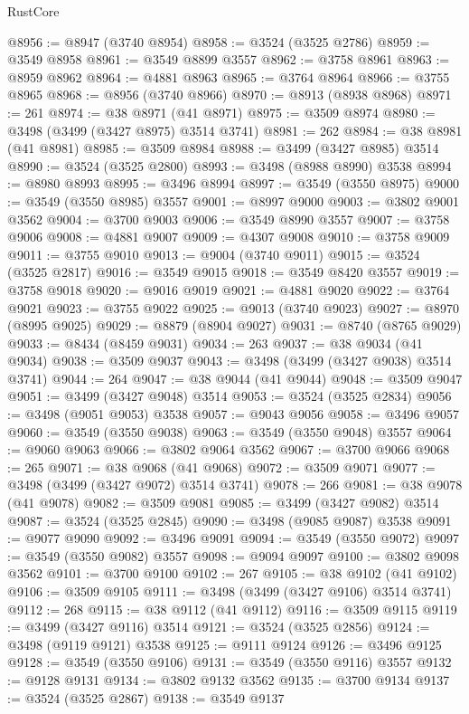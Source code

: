 \begin{lexlean}{RustCore}
\begin{coremodule}
@8956 := @8947 (@3740 @8954)
@8958 := @3524 (@3525 @2786)
@8959 := @3549 @8958
@8961 := @3549 @8899 @3557
@8962 := @3758 @8961
@8963 := @8959 @8962
@8964 := @4881 @8963
@8965 := @3764 @8964
@8966 := @3755 @8965
@8968 := @8956 (@3740 @8966)
@8970 := @8913 (@8938 @8968)
@8971 := 261
@8974 := @38 @8971 (@41 @8971)
@8975 := @3509 @8974
@8980 := @3498 (@3499 (@3427 @8975) @3514 @3741)
@8981 := 262
@8984 := @38 @8981 (@41 @8981)
@8985 := @3509 @8984
@8988 := @3499 (@3427 @8985) @3514
@8990 := @3524 (@3525 @2800)
@8993 := @3498 (@8988 @8990) @3538
@8994 := @8980 @8993
@8995 := @3496 @8994
@8997 := @3549 (@3550 @8975)
@9000 := @3549 (@3550 @8985) @3557
@9001 := @8997 @9000
@9003 := @3802 @9001 @3562
@9004 := @3700 @9003
@9006 := @3549 @8990 @3557
@9007 := @3758 @9006
@9008 := @4881 @9007
@9009 := @4307 @9008
@9010 := @3758 @9009
@9011 := @3755 @9010
@9013 := @9004 (@3740 @9011)
@9015 := @3524 (@3525 @2817)
@9016 := @3549 @9015
@9018 := @3549 @8420 @3557
@9019 := @3758 @9018
@9020 := @9016 @9019
@9021 := @4881 @9020
@9022 := @3764 @9021
@9023 := @3755 @9022
@9025 := @9013 (@3740 @9023)
@9027 := @8970 (@8995 @9025)
@9029 := @8879 (@8904 @9027)
@9031 := @8740 (@8765 @9029)
@9033 := @8434 (@8459 @9031)
@9034 := 263
@9037 := @38 @9034 (@41 @9034)
@9038 := @3509 @9037
@9043 := @3498 (@3499 (@3427 @9038) @3514 @3741)
@9044 := 264
@9047 := @38 @9044 (@41 @9044)
@9048 := @3509 @9047
@9051 := @3499 (@3427 @9048) @3514
@9053 := @3524 (@3525 @2834)
@9056 := @3498 (@9051 @9053) @3538
@9057 := @9043 @9056
@9058 := @3496 @9057
@9060 := @3549 (@3550 @9038)
@9063 := @3549 (@3550 @9048) @3557
@9064 := @9060 @9063
@9066 := @3802 @9064 @3562
@9067 := @3700 @9066
@9068 := 265
@9071 := @38 @9068 (@41 @9068)
@9072 := @3509 @9071
@9077 := @3498 (@3499 (@3427 @9072) @3514 @3741)
@9078 := 266
@9081 := @38 @9078 (@41 @9078)
@9082 := @3509 @9081
@9085 := @3499 (@3427 @9082) @3514
@9087 := @3524 (@3525 @2845)
@9090 := @3498 (@9085 @9087) @3538
@9091 := @9077 @9090
@9092 := @3496 @9091
@9094 := @3549 (@3550 @9072)
@9097 := @3549 (@3550 @9082) @3557
@9098 := @9094 @9097
@9100 := @3802 @9098 @3562
@9101 := @3700 @9100
@9102 := 267
@9105 := @38 @9102 (@41 @9102)
@9106 := @3509 @9105
@9111 := @3498 (@3499 (@3427 @9106) @3514 @3741)
@9112 := 268
@9115 := @38 @9112 (@41 @9112)
@9116 := @3509 @9115
@9119 := @3499 (@3427 @9116) @3514
@9121 := @3524 (@3525 @2856)
@9124 := @3498 (@9119 @9121) @3538
@9125 := @9111 @9124
@9126 := @3496 @9125
@9128 := @3549 (@3550 @9106)
@9131 := @3549 (@3550 @9116) @3557
@9132 := @9128 @9131
@9134 := @3802 @9132 @3562
@9135 := @3700 @9134
@9137 := @3524 (@3525 @2867)
@9138 := @3549 @9137

\end{coremodule}
\end{lexlean}
